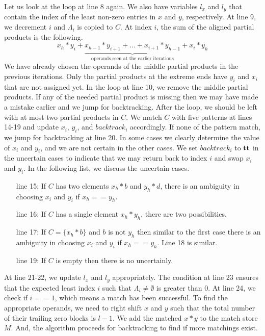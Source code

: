 Let us look at the loop at line 8 again.
%
We also have variables $l_x$ and $l_y$ that contain the index of
the least non-zero entries in $x$ and $y$, respectively.
%
At line 9, we decrement $i$ and $\Lambda_i$ is copied to $C$.
%
At index $i$, the sum of the aligned partial products is the following.
$$
x_{h}*y_{i} + \underbrace{x_{h-1}*y_{i+1} + \dots + x_{i+1}*y_{h-1}}_{\text{operands seen at the earlier iterations}} + x_{i}*y_{h}
$$
We have already chosen the operands of the middle partial products in
the previous iterations.
%
Only the partial products at the extreme ends have $y_i$ and $x_i$ that are
not assigned yet.
%
In the loop at line 10, we remove the middle partial products.
%
If any of the needed partial product is missing then we may have made a mistake
earlier and we jump for backtracking.
%
After the loop, we should be left with at most two partial products in $C$.
%
We match $C$ with five patterns at lines 14-19 and
update $x_i$, $y_i$, and $backtrack_i$ accordingly.
%
If none of the pattern match, we jump for backtracking at line 20.
%
In some cases we clearly determine the value of $x_i$ and $y_i$, and
we are not certain in the other cases.
%
We set $backtrack_i$ to $\mathbf{tt}$ in the uncertain cases to indicate
that we may return back to index $i$ and swap $x_i$ and $y_i$.
%
In the following list, we discuss the uncertain cases.
%
\begin{itemize}
\item[line 15:] If $C$ has two elements $x_h*b$ and $y_h*d$,
there is an ambiguity in choosing $x_i$ and $y_i$
if $x_h == y_h$.
%
\item[line 16:] If $C$ has a single element $x_h*y_h$, there  
are two possibilities.
\item[line 17:] If $C = \{x_h*b\}$ and $b$ is not $y_h$ then 
  similar to the first case there is an ambiguity in
  choosing $x_i$ and $y_i$ if $x_h == y_h$. Line 18 is similar.
\item[line 19:] If $C$ is empty then there is no uncertainly. %
\end{itemize}
%
At line 21-22, we update $l_x$ and $l_y$ appropriately.
%
The condition at line 23 ensures that the expected
least index $i$ such that $\Lambda_i \neq \emptyset$ is greater than 0.    
%
At line 24, we check if $i==1$, which means a match has been successful.
%
To find the appropriate operands, we need to right shift $x$ and $y$
such that the total number of their trailing zero blocks is $l-1$.
%
We add the matched $x*y$ to the match store $M$.
%
And, the algorithm proceeds for backtracking to find if more matchings
exist.


